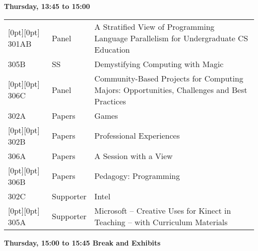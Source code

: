 \noindent
{\sffamily\bfseries Thursday, 13:45 to 15:00}\newline\noindent
\begin{tabular*}{5in}{@{}p{0.5in}@{}p{0.75in}@{}p{3.75in}}

\rowcolor[gray]{0.9}[0pt][0pt] 301AB & Panel & A Stratified View of Programming Language Parallelism for Undergraduate CS Education \\

305B & SS & Demystifying Computing with Magic \\

\rowcolor[gray]{0.9}[0pt][0pt] 306C & Panel & Community-Based Projects for Computing Majors:  Opportunities, Challenges and Best Practices \\

302A & Papers & Games \\

\rowcolor[gray]{0.9}[0pt][0pt] 302B & Papers & Professional Experiences \\

306A & Papers & A Session with a View \\

\rowcolor[gray]{0.9}[0pt][0pt] 306B & Papers & Pedagogy:  Programming \\

302C & Supporter & Intel \\

\rowcolor[gray]{0.9}[0pt][0pt] 305A & Supporter & Microsoft -- Creative Uses for Kinect in Teaching – with Curriculum Materials 
\end{tabular*}
{\sffamily\bfseries Thursday, 15:00 to 15:45 Break and Exhibits}\newline\noindent


